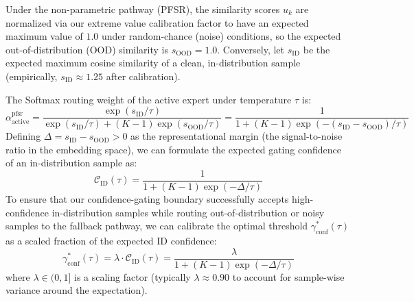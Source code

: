 \documentclass{article}
\theoremstyle{plain}
\theoremstyle{definition}
\theoremstyle{remark}
\begin{document}
Under the non-parametric pathway (PFSR), the similarity scores $u_k$ are normalized via our extreme value calibration factor to have an expected maximum value of $1.0$ under random-chance (noise) conditions, so the expected out-of-distribution (OOD) similarity is $s_{\text{OOD}} = 1.0$. Conversely, let $s_{\text{ID}}$ be the expected maximum cosine similarity of a clean, in-distribution sample (empirically, $s_{\text{ID}} \approx 1.25$ after calibration). 

The Softmax routing weight of the active expert under temperature $\tau$ is:
\begin{equation}
\alpha^{\text{pfsr}}_{\text{active}} = \frac{\exp(s_{\text{ID}} / \tau)}{\exp(s_{\text{ID}} / \tau) + (K-1) \exp(s_{\text{OOD}} / \tau)} = \frac{1}{1 + (K-1) \exp(-(s_{\text{ID}} - s_{\text{OOD}}) / \tau)}
\end{equation}
Defining $\Delta = s_{\text{ID}} - s_{\text{OOD}} > 0$ as the representational margin (the signal-to-noise ratio in the embedding space), we can formulate the expected gating confidence of an in-distribution sample as:
\begin{equation}
\mathcal{C}_{\text{ID}}(\tau) = \frac{1}{1 + (K-1) \exp(-\Delta / \tau)}
\end{equation}
To ensure that our confidence-gating boundary successfully accepts high-confidence in-distribution samples while routing out-of-distribution or noisy samples to the fallback pathway, we can calibrate the optimal threshold $\gamma_{\text{conf}}^*(\tau)$ as a scaled fraction of the expected ID confidence:
\begin{equation}
\gamma_{\text{conf}}^*(\tau) = \lambda \cdot \mathcal{C}_{\text{ID}}(\tau) = \frac{\lambda}{1 + (K-1) \exp(-\Delta / \tau)}
\end{equation}
where $\lambda \in (0, 1]$ is a scaling factor (typically $\lambda \approx 0.90$ to account for sample-wise variance around the expectation). 
\end{document}
